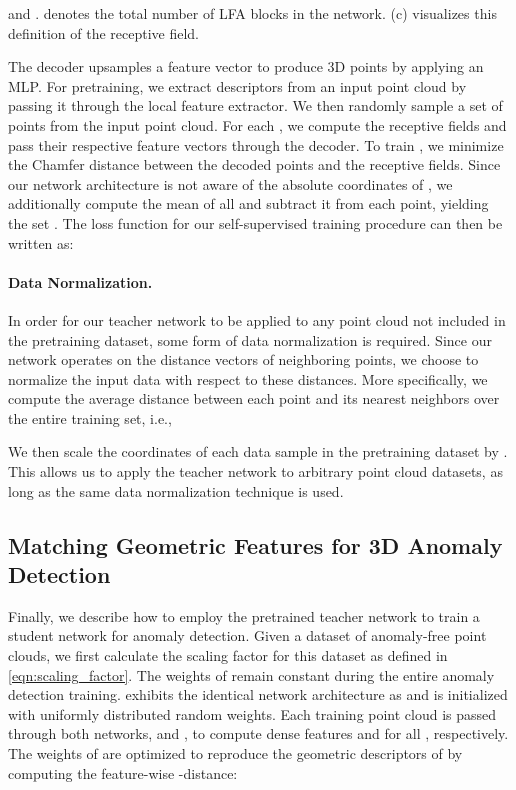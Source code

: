\documentclass[twoside,11pt]{article}
\begin{document}
and .  denotes the total number of LFA blocks in the network. (c) visualizes this definition of the receptive field.

The decoder  upsamples a feature vector to produce  3D points by applying an MLP\@. For pretraining, we extract descriptors from an input point cloud by passing it through the local feature extractor. We then randomly sample a set of points  from the input point cloud. For each , we compute the receptive fields  and pass their respective feature vectors through the decoder. To train , we minimize the Chamfer distance \citep{chamfer_distance} between the decoded points and the receptive fields. Since our network architecture is not aware of the absolute coordinates of , we additionally compute the mean  of all  and subtract it from each point, yielding the set . The loss function for our self-supervised training procedure can then be written as:



\paragraph{\textbf{Data Normalization.}}
In order for our teacher network to be applied to any point cloud not included in the pretraining dataset, some form of data normalization is required. Since our network operates on the distance vectors of neighboring points, we choose to normalize the input data with respect to these distances. More specifically, we compute the average distance between each point and its nearest neighbors over the entire training set, i.e.,

We then scale the coordinates of each data sample in the pretraining dataset by . This allows us to apply the teacher network to arbitrary point cloud datasets, as long as the same data normalization technique is used. 

\subsection{Matching Geometric Features for 3D Anomaly Detection}

Finally, we describe how to employ the pretrained teacher network  to train a student network  for anomaly detection. Given a dataset of anomaly-free point clouds, we first calculate the scaling factor  for this dataset as defined in \eqref{eqn:scaling_factor}. The weights of  remain constant during the entire anomaly detection training.  exhibits the identical network architecture as  and is initialized with uniformly distributed random weights. Each training point cloud  is passed through both networks,  and , to compute dense features  and  for all , respectively. The weights of  are optimized to reproduce the geometric descriptors of  by computing the feature-wise -distance:
\end{document}
